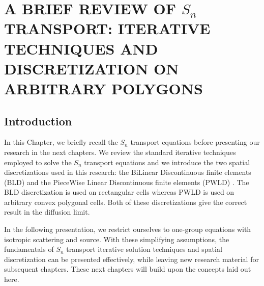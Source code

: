 \chapter{\uppercase{A Brief Review of $S_n$ Transport: Iterative Techniques
and Discretization on Arbitrary Polygons}} \label{spatial_chapter}
\section{Introduction}                      
In this Chapter, we briefly recall the $S_n$ transport equations before presenting 
our research in the next chapters. We review the standard iterative 
techniques employed to solve the $S_n$ transport equations and we introduce the 
two spatial discretizations used in this research: the BiLinear Discontinuous 
finite elements (BLD) \cite{thick_dgfem,lumping_bld} and the PieceWise Linear 
Discontinuous finite elements (PWLD) \cite{pwld_3d,pwld_2d}. The BLD 
discretization is used on rectangular cells whereas PWLD is used 
on arbitrary convex polygonal cells. Both of these discretizations give the 
correct result in the diffusion limit. 

In the following presentation, we restrict ourselves to one-group equations
with isotropic scattering and source. With these simplifying assumptions,
the fundamentals of $S_n$ transport iterative solution techniques and
spatial discretization can be presented effectively, while leaving new
research material for subsequent chapters. These next chapters will build
upon the concepts laid out here.
